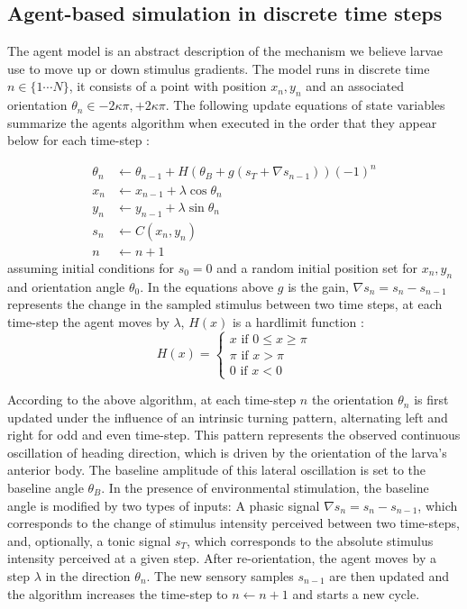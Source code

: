 \documentclass[11pt,a4paper]{article}
\begin{document}
\subsection{Agent-based simulation in discrete time steps}
\label{sec:methodsDiscreteAgent}
The agent model is an abstract description of the mechanism we believe larvae use to move up or down stimulus gradients. 
The model runs in discrete time $n \in \{1 \cdots N\}$, it consists of a point with position $x_n,y_n$ and an associated orientation $\theta_n \in {-2 \kappa \pi,+2 \kappa \pi}$.
 The following update equations of state variables summarize the agents algorithm when executed in the order that they appear below for each time-step :

\begin{align}
\theta_{n} &\leftarrow \theta_{n-1} + H(\theta_B + g (s_{T} + \nabla s_{n-1})){(-1)}^n\\
x_n & \leftarrow x_{n-1}+ \lambda \cos \theta_{n} \\
y_n &\leftarrow y_{n-1}+ \lambda  \sin \theta_{n}\\
s_n &\leftarrow C(x_n,y_n)\\
n &\leftarrow n+1
\label{eqn:Discretemodel}
\end{align}
assuming initial conditions for $s_0 = 0$ and a random initial position set for $x_n,y_n$ and orientation angle $\theta_0$.
In the equations above $g$ is the gain, $\nabla s_{n}  = s_{n} - s_{n-1}$ represents the change in the sampled stimulus between two time steps,  at each time-step the agent moves by $\lambda$,  $H(x)$ is a hardlimit function :
\begin{equation}
H(x) =
\begin{cases}
x \mbox{ if } 0 \leq x \geq \pi \\
\pi \mbox{ if } x > \pi  \\
0 \mbox{ if } x < 0 
\end{cases}
\label{eq:boundary}
\end{equation}

According to the above algorithm, at each time-step $n$ the orientation $\theta_n$ is first updated under the influence of an intrinsic  turning pattern, alternating left and right for odd and even time-step. 
This pattern represents the observed continuous oscillation of heading direction, which is driven by the orientation of the larva's anterior body.
 The baseline amplitude of this lateral oscillation is set to the baseline angle $\theta_B$.
  In the presence of environmental stimulation, the baseline angle is modified by two types of inputs: A phasic signal $\nabla s_{n}  = s_{n} - s_{n-1}$, which corresponds to the change of stimulus intensity perceived between two time-steps, and, optionally, a tonic signal $s_{T}$, which corresponds to the absolute stimulus intensity perceived at a given step.
After re-orientation, the agent moves by a step $\lambda$ in the direction $\theta_n$. The new sensory samples $s_{n-1}$ are then updated and the algorithm increases the time-step to $n  \leftarrow n+1$ and starts a new cycle.
\end{document}
